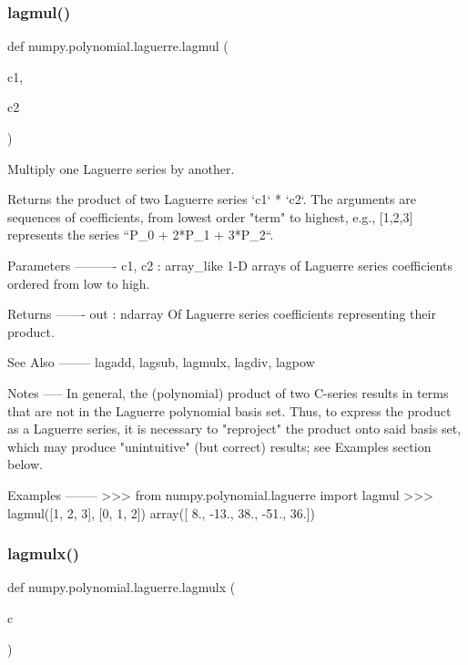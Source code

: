 \subsubsection{\texorpdfstring{lagmul()}{lagmul()}}
{\footnotesize\ttfamily def numpy.\+polynomial.\+laguerre.\+lagmul (\begin{DoxyParamCaption}\item[{}]{c1,  }\item[{}]{c2 }\end{DoxyParamCaption})}

\begin{DoxyVerb}Multiply one Laguerre series by another.

Returns the product of two Laguerre series `c1` * `c2`.  The arguments
are sequences of coefficients, from lowest order "term" to highest,
e.g., [1,2,3] represents the series ``P_0 + 2*P_1 + 3*P_2``.

Parameters
----------
c1, c2 : array_like
    1-D arrays of Laguerre series coefficients ordered from low to
    high.

Returns
-------
out : ndarray
    Of Laguerre series coefficients representing their product.

See Also
--------
lagadd, lagsub, lagmulx, lagdiv, lagpow

Notes
-----
In general, the (polynomial) product of two C-series results in terms
that are not in the Laguerre polynomial basis set.  Thus, to express
the product as a Laguerre series, it is necessary to "reproject" the
product onto said basis set, which may produce "unintuitive" (but
correct) results; see Examples section below.

Examples
--------
>>> from numpy.polynomial.laguerre import lagmul
>>> lagmul([1, 2, 3], [0, 1, 2])
array([  8., -13.,  38., -51.,  36.])\end{DoxyVerb}
 \mbox{\label{namespacenumpy_1_1polynomial_1_1laguerre_a8d62d0519894c9382e106791df329620}} 
\subsubsection{\texorpdfstring{lagmulx()}{lagmulx()}}
{\footnotesize\ttfamily def numpy.\+polynomial.\+laguerre.\+lagmulx (\begin{DoxyParamCaption}\item[{}]{c }\end{DoxyParamCaption})}

